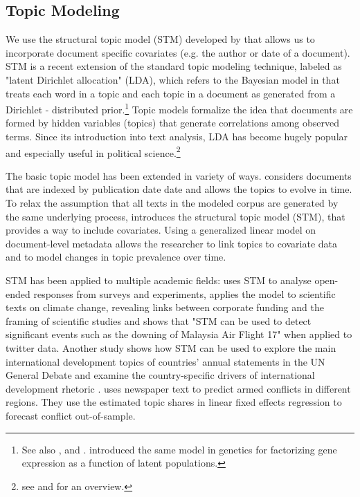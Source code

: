 \documentclass[12pt,a4paper,notitlepage]{article}
\begin{document}
\subsection{Topic Modeling}

We use the structural topic model (STM) developed by \citet{roberts_model_2016} that allows us to incorporate document specific covariates (e.g. the author or date of a document). STM is a recent extension of the standard topic modeling technique, labeled as "latent Dirichlet allocation" (LDA), which refers to the Bayesian model in \citet{blei_latent_2003} that treats each word in a topic and each topic in a document as generated from a Dirichlet - distributed prior.\footnote{See also \citet{griffiths_probabilistic_2002}, \citet{griffiths_finding_2004} and \citet{hofmann_probabilistic_1999}. \citet{pritchard_inference_2000} introduced the same model in genetics for factorizing gene expression as a function of latent populations.} Topic models formalize the idea that documents are formed by hidden variables (topics) that generate correlations among observed terms. Since its introduction into text analysis, LDA has become hugely popular and especially useful in political science.\footnote{see \citet{blei_probabilistic_2012} and \citet{grimmer_text_2013} for an overview.}

The basic topic model has been extended in variety of ways. \citet{blei_dynamic_2006} considers documents that are indexed by publication date date and allows the topics to evolve in time. To relax the assumption that all texts in the modeled corpus are generated by the same underlying process, \cite{roberts_model_2016} introduces the structural topic model (STM), that provides a way to include covariates. Using a generalized linear model on document-level metadata allows the researcher to link topics to covariate data and to model changes in topic prevalence over time. 

STM has been applied to multiple academic fields: \citet{roberts_structural_2014} uses STM to analyse open-ended responses from surveys and experiments, \citet{farrell_corporate_2016} applies the model to scientific texts on climate change, revealing links between corporate funding and the framing of scientific studies and \citet{mishler_using_2015} shows that "STM can be used to detect significant events such as the downing of Malaysia Air Flight 17" when applied to twitter data. Another study shows how STM can be used to explore the main international development topics of countries’ annual statements in the UN General Debate and examine the country-specific drivers of international development rhetoric \citep{baturo_what_2017}. \citet{mueller_reading_2016} uses newspaper text to predict armed conflicts in different regions. They use the estimated topic shares in linear fixed effects regression to forecast conflict out-of-sample.
\end{document}
